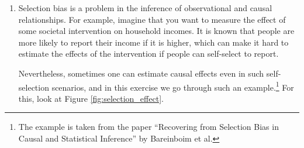 \begin{enumerate}[label=8.\arabic*]
\begin{ungradedsolution}
\begin{enumerate}
            $p(R \given \doit(D=1)) < p(R \given \doit(D=0))$. So assuming
            the causal structure in Figure \ref{fig:Simpson}(i), the advice would be not to take the drug.
            \item Now $M$ is a descendant of $D$, so we cannot use $\{M\}$ for adjustment. There are no back-door paths $D \leftarrow \dots \dots R$, so
            $\emptyset$ is sufficient for adjustment:
            $$p(R \given \doit(D)) = p(R \given D)$$
            \item Yes.
            \item As $p(R \given D=1) > p(R \given D=0)$, this means that now $p(R \given \doit(D=1)) > p(R \given \doit(D=0))$. So assuming the causal
            structure is as in Figure \ref{fig:Simpson}(ii), the advice for (all) patients is to take the drug.
            \item Left to the imagination of the reader.
            \item $\emptyset$ is sufficient for adjustment according to the back-door criterion, so
            $$p(R \given \doit(D)) = p(R \given D).$$
            \item Yes.
            \item Same as in \ref{Simpson_2}: all patients should take the drug.
        \end{enumerate}
    \end{ungradedsolution}

    \item %
    Selection bias is a problem in the inference of observational and causal relationships.
    For example, imagine that you want to measure the effect of some societal intervention on household incomes.
    It is known that people are more likely to report their income if it is higher, which can make it hard to estimate the effects of the intervention if people can self-select to report.

    Nevertheless, sometimes one can estimate causal effects even in such self-selection scenarios, and in this exercise we go through such an example.\footnote{The example is taken from the paper ``Recovering from Selection Bias in Causal and Statistical Inference'' by Bareinboim et al.}
    For this, look at Figure \ref{fig:selection_effect}.


\end{enumerate}
